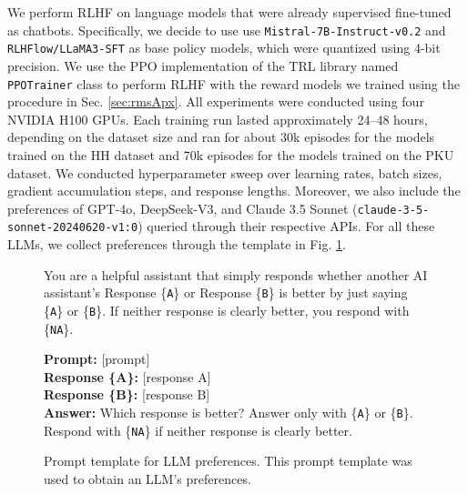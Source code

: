 \documentclass{article}
\begin{document}
We perform RLHF on language models that were already supervised fine-tuned as chatbots. Specifically, we decide to use use \texttt{Mistral-7B-Instruct-v0.2} and \texttt{RLHFlow/LLaMA3-SFT} as base policy models, which were quantized using 4-bit precision.
We use the PPO implementation of the TRL library named \texttt{PPOTrainer} class to perform RLHF with the reward models we trained using the procedure in Sec. \ref{sec:rmsApx}.
All experiments were conducted using four NVIDIA H100 GPUs. Each training run lasted approximately 24–48 hours, depending on the dataset size and ran for about 30k episodes for the models trained on the HH dataset and 70k episodes for the models trained on the PKU dataset.
We conducted hyperparameter sweep over learning rates, batch sizes, gradient accumulation steps, and response lengths.
Moreover, we also include the preferences of GPT-4o, DeepSeek-V3, and Claude 3.5 Sonnet (\texttt{claude-3-5-sonnet-20240620-v1:0}) queried through their respective APIs. For all these LLMs, we collect preferences through the template in Fig. \ref{prompt:LLMPreferenceTemplate}.


\begin{figure}[h]
\begin{tcolorbox}[title=LLM preference template]\label{prompt:LLMOracle}
You are a helpful assistant that simply responds whether another AI assistant's Response \{\texttt{A}\} or Response \{\texttt{B}\} 
is better by just saying \{\texttt{A}\} or \{\texttt{B}\}. If neither response is clearly better, you respond with \{\texttt{NA}\}.

\textbf{Prompt:} [prompt] \\
\textbf{Response \{A\}:} [response A] \\
\textbf{Response \{B\}:} [response B] \\
\textbf{Answer:} Which response is better? Answer only with \{\texttt{A}\} or \{\texttt{B}\}. Respond with \{\texttt{NA}\} if neither response is clearly better.
\end{tcolorbox}
\caption{Prompt template for LLM preferences. This prompt template was used to obtain an LLM’s preferences.}
\label{prompt:LLMPreferenceTemplate}
\end{figure}
\end{document}
